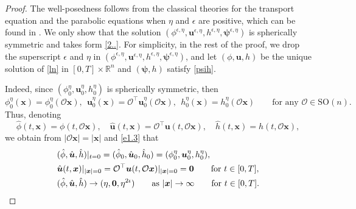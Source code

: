 \documentclass[11pt,reqno]{amsart}
\numberwithin{rk}{section}
\numberwithin{prop}{section}
\numberwithin{mydef}{section}
\numberwithin{lem}{section}
\numberwithin{equation}{section}
\numberwithin{thm}{section}
\begin{document}
\begin{proof} 
The well-posedness follows from the classical theories for the transport equation and the parabolic equations when $\eta$
and $\epsilon$ are positive, which can be found in  \cite{oar,amj}. We only show that the solution $(\phi^{\epsilon,\eta},\boldsymbol{u}^{\epsilon,\eta},h^{\epsilon,\eta},\boldsymbol{\psi}^{\epsilon,\eta})$ is spherically symmetric and takes form \eqref{2..}. For simplicity, in the rest of the proof, we drop the superscript $\epsilon$ and $\eta$ in $(\phi^{\epsilon,\eta},\boldsymbol{u}^{\epsilon,\eta},h^{\epsilon,\eta},\boldsymbol{\psi}^{\epsilon,\eta})$, and let  $(\phi,\boldsymbol{u},h)$ be the unique solution of  \eqref{ln} in $[0,T]\times\mathbb{R}^n$ and $(\boldsymbol{\psi},h)$ satisfy \eqref{psih}. 

Indeed, since $(\phi_0^\eta,\boldsymbol{u}_0^\eta,h_0^\eta)$ is spherically symmetric, then
\begin{equation*} 
\phi_0^\eta(\boldsymbol{x})=\phi_0^\eta(\mathcal{O}\boldsymbol{x}), \ \  \boldsymbol{u}_0^\eta(\boldsymbol{x})= \mathcal{O}^\top\boldsymbol{u}_0^\eta(\mathcal{O}\boldsymbol{x}), \ \ h_0^\eta(\boldsymbol{x})= h_0^\eta(\mathcal{O}\boldsymbol{x})\qquad\text{for any  $\mathcal{O}\in \mathrm{SO}(n)$}.
\end{equation*}
Thus, denoting
\begin{equation*}
\hat\phi(t,\boldsymbol{x})=\phi(t,\mathcal{O}\boldsymbol{x}),\quad \hat{\boldsymbol{u}}(t,\boldsymbol{x})=\mathcal{O}^{\top}\boldsymbol{u}(t,\mathcal{O}\boldsymbol{x}),\quad \hat{h}(t,\boldsymbol{x})=h(t,\mathcal{O}\boldsymbol{x}),
\end{equation*}
we obtain from  $|\mathcal{O}\boldsymbol{x}|=|\boldsymbol{x}|$ and \eqref{e1.3} that
\begin{equation*}
\begin{aligned}
&(\hat\phi,\hat{\boldsymbol{u}},\hat{h})|_{t=0}=(\hat\phi_0,\hat{\boldsymbol{u}}_0,\hat{h}_0)=(\phi_0^\eta,\boldsymbol{u}_0^\eta,h_0^\eta),\\
&\hat{\boldsymbol{u}}(t,\boldsymbol{x})|_{|\boldsymbol{x}|=0} =\mathcal{O}^{\top}\boldsymbol{u}(t, \mathcal{O}\boldsymbol{x})|_{|\boldsymbol{x}|=0} =\boldsymbol{0} \qquad \text{for $t\in [0,T]$},\\
&(\hat\phi,\hat{\boldsymbol{u}},\hat h)\to (\eta,\boldsymbol{0},\eta^{2\iota}) \qquad 
 \text{as $|\boldsymbol{x}|\to \infty$} \hspace{7mm}  \text{for $t\in [0,T]$}.
\end{aligned}
\end{equation*}
 

\end{proof}
\end{document}
